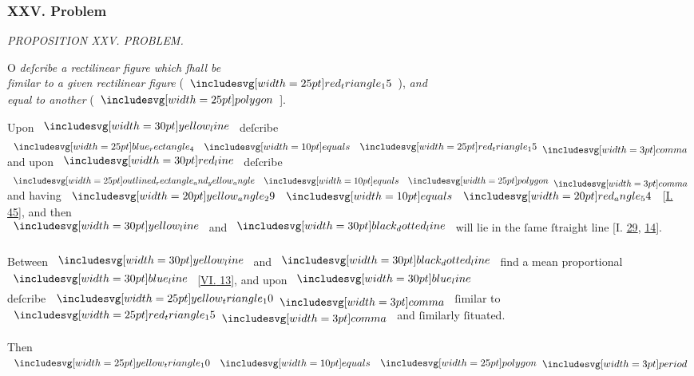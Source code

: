 \documentclass[12pt,preview]{standalone}
\begin{document}
\subsubsection{XXV. Problem}

\begin{minipage}[t]{0.64\textwidth}
    \vspace{0pt}

    \begin{center}
        \textit{PROPOSITION XXV. PROBLEM.}\label{book6pr25} \\
    \end{center}

    \hfill

    \begin{center}
        \raggedright \lettrine[lines=4, loversize=1, nindent=0pt]{}{}O \textit{deſcribe a rectilinear figure which ſhall be\\ ſimilar to a given rectilinear figure} (\hspace{-1ex}$\img{red_triangle_15}$\hspace{-1ex}), \textit{and\\ equal to another} (\hspace{-1ex}$\img{polygon}$\hspace{-1ex}].
    \end{center}

    \hfill

    \hfill

    \begin{center}
        Upon $\yellowline$ deſcribe $\img{blue_rectangle_4} \bequals \img{red_triangle_15} \bcomma$\\
        and upon $\redline$ deſcribe $\img{outlined_rectangle_and_yellow_angle} \bequals \img{polygon} \bcomma$\\
        and having $\img[0][0][20]{yellow_angle_29} \bequals \img[0][0][20]{red_angle_54}$  [\hyperref[book1pr45]{\textsc{I.} 45}], and then\\
        $\yellowline$ and $\dottedblackline$ will lie in the ſame ſtraight line [\textsc{I.} \hyperref[book1pr29]{29}, \hyperref[book1pr14]{14}].\\
        \hfill\\
        Between $\yellowline$ and $\dottedblackline$ find a mean proportional\\
        $\blueline$ [\hyperref[book6pr13]{\textsc{VI.} 13}], and upon $\blueline$\\
        deſcribe $\img{yellow_triangle_10} \bcomma$ ſimilar to $\img{red_triangle_15} \bcomma$ and ſimilarly ſituated.\\
        \hfill\\
        Then $\img{yellow_triangle_10} \bequals \img{polygon} \bperiod$
    \end{center}


\end{minipage}
\end{document}
